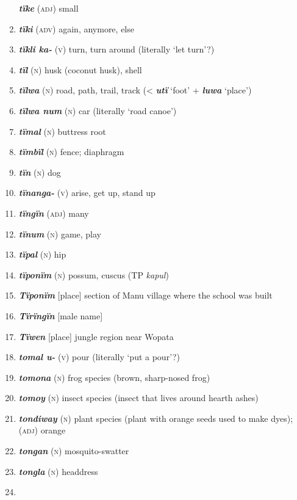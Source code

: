 \begin{enumerate}[noitemsep, label={}, align=left, widest=190, labelsep=1ex,leftmargin=*,itemindent=-10pt]
\textbf{\textit{tïke}} (\textsc{adj}) small \item 
\textbf{\textit{tïki}} (\textsc{adv}) again, anymore, else \item 
\textbf{\textit{tïkli ka-}} (\textsc{v}) turn, turn around (literally ‘let turn’?) \item 
\textbf{\textit{tïl}} (\textsc{n}) husk (coconut husk), shell \item 
\textbf{\textit{tïlwa}} (\textsc{n}) road, path, trail, track (< \textbf{\textit{utï}} ‘foot’ + \textbf{\textit{luwa}} ‘place’) \item 
\textbf{\textit{tïlwa num}} (\textsc{n}) car (literally ‘road canoe’) \item 
\textbf{\textit{tïmal}} (\textsc{n}) buttress root \item 
\textbf{\textit{tïmbïl}} (\textsc{n}) fence; diaphragm \item 
\textbf{\textit{tïn}} (\textsc{n}) dog \item 
\textbf{\textit{tïnanga-}} (\textsc{v}) arise, get up, stand up \item 
\textbf{\textit{tïngïn}} (\textsc{adj}) many \item 
\textbf{\textit{tïnum}} (\textsc{n}) game, play \item 
\textbf{\textit{tïpal}} (\textsc{n}) hip \item 
\textbf{\textit{tïponïm}} (\textsc{n}) possum, cuscus (TP \textit{kapul}) \item 
\textbf{\textit{Tïponïm}} [place] section of Manu village where the school was built \item 
\textbf{\textit{Tïrïngïn}} [male name] \item 
\textbf{\textit{Tïwen}} [place] jungle region near Wopata \item 
\textbf{\textit{tomal u-}} (\textsc{v}) pour (literally ‘put a pour’?) \item 
\textbf{\textit{tomona}} (\textsc{n}) frog species (brown, sharp-nosed frog) \item 
\textbf{\textit{tomoy}} (\textsc{n}) insect species (insect that lives around hearth ashes) \item 
\textbf{\textit{tondiway}} (\textsc{n}) plant species (plant with orange seeds used to make dyes); \linebreak (\textsc{adj}) orange \item 
\textbf{\textit{tongan}} (\textsc{n}) mosquito-swatter \item 
\textbf{\textit{tongla}} (\textsc{n}) headdress \item 

\end{enumerate}
